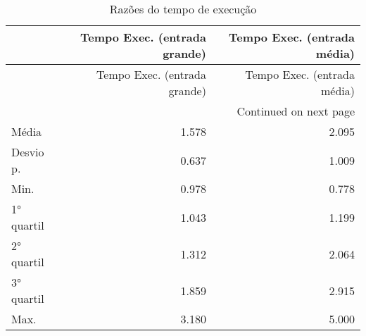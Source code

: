\begin{longtable}{lrr}\caption{Razões do tempo de execução \label{time_stat_analisys}} \\
\toprule
{} &  Tempo Exec. (entrada grande) &  Tempo Exec. (entrada média) \\
\midrule
\endfirsthead

\toprule
{} &  Tempo Exec. (entrada grande) &  Tempo Exec. (entrada média) \\
\midrule
\endhead
\midrule
\multicolumn{3}{r}{{Continued on next page}} \\
\midrule
\endfoot

\bottomrule
\endlastfoot
Média      &                         1.578 &                        2.095 \\
Desvio p.  &                         0.637 &                        1.009 \\
Min.       &                         0.978 &                        0.778 \\
1° quartil &                         1.043 &                        1.199 \\
2° quartil &                         1.312 &                        2.064 \\
3° quartil &                         1.859 &                        2.915 \\
Max.       &                         3.180 &                        5.000 \\
\end{longtable}
